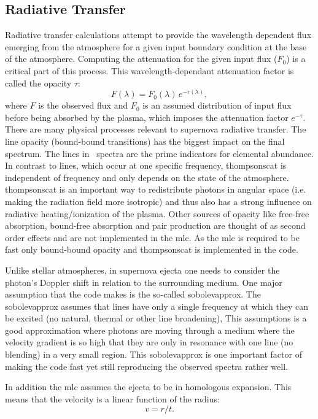 \subsection{Radiative Transfer}
Radiative transfer calculations attempt to provide the wavelength dependent flux emerging from the atmosphere for a given input boundary condition at the base of the atmosphere. Computing the attenuation for the given input flux ($F_0$) is a critical part of this process. This wavelength-dependant attenuation factor is called the opacity $\tau$:
\begin{equation}
\label{eq:rad_trans}
	F(\lambda) = F_0(\lambda)\,e^{-\tau(\lambda)},
\end{equation}
where $F$ is the observed flux and $F_0$ is an assumed distribution of input flux before being absorbed by the plasma, which imposes the attenuation factor $e^{-\tau}$.
There are many physical processes relevant to supernova radiative transfer. The line opacity (bound-bound transitions) has the biggest impact on the final spectrum. The lines in \snia\ spectra are the prime indicators for elemental abundance. In contrast to lines, which occur at one specific frequency, \gls{thompsonscat} is independent of frequency and only depends on the state of the atmosphere. \gls{thompsonscat} is an important way to redistribute photons in angular space (i.e. making the radiation field more isotropic) and thus also has a strong influence on radiative heating/ionization of the plasma. Other sources of opacity like free-free absorption, bound-free absorption and pair production are thought of as second order effects and are not implemented in the \gls{mlc}. As the \gls{mlc} is required to be fast only bound-bound opacity and \gls{thompsonscat} is implemented in the code.

Unlike stellar atmospheres, in supernova ejecta one needs to consider the photon's Doppler shift in relation to the surrounding medium. One major assumption that the code makes is the so-called \gls{sobolevapprox}. The \gls{sobolevapprox} assumes that lines have only a single frequency at which they can be excited  (no natural, thermal or other line broadening), This assumptions is a good approximation where photons are moving through a medium where the velocity gradient is so high that they are only in resonance with one line (no blending) in a very small region. This \gls{sobolevapprox} is one important factor of making the code fast yet still reproducing the observed spectra rather well.

In addition the \gls{mlc} assumes the ejecta to be in homologous expansion. This means that the velocity is a linear function of the radius:
\[
	v=  r / t.
\]

